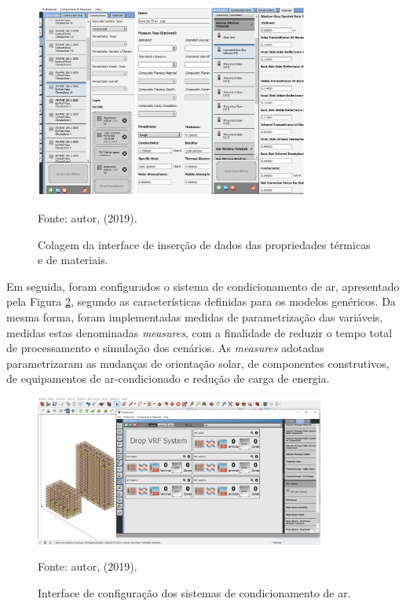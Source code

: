 \begin{figure}[H]
    \centering
    \caption{Colagem da interface de inserção de dados das propriedades térmicas e de materiais.}
    \includegraphics[width=0.8\textwidth]{figures/fig17-OS2.png}
    \begin{flushleft}
        \par \small Fonte: autor, (2019).
    \end{flushleft}
    \label{fig:figure17}
\end{figure}
\noindent Em seguida, foram configurados o sistema de condicionamento de ar, apresentado pela Figura \ref{fig:figure18}, segundo as características definidas para os modelos genéricos. Da mesma forma, foram implementadas medidas de parametrização das variáveis, medidas estas denominadas \textit{measures}, com a finalidade de reduzir o tempo total de processamento e simulação dos cenários. As \textit{measures} adotadas parametrizaram as mudanças de orientação solar, de componentes construtivos, de equipamentos de ar-condicionado e redução de carga de energia.\vspace*{-0.25cm}
\begin{figure}[H]
    \centering
    \caption{Interface de configuração dos sistemas de condicionamento de ar.}
    \includegraphics[width=0.85\textwidth]{figures/fig18-OS3.png}
    \begin{flushleft}
        \par \small Fonte: autor, (2019).
    \end{flushleft}
    \label{fig:figure18}
\end{figure}

